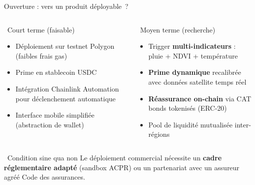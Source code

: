 \documentclass[aspectratio=169, 10pt, t]{beamer}
\begin{document}
\begin{frame}{Ouverture : vers un produit déployable~?}
  \begin{columns}[t]
      \begin{block}{\faRocket\ Court terme (faisable)}
        \begin{itemize}
          \setlength{\itemsep}{4pt}
          \item Déploiement sur testnet Polygon (faibles frais gas)
          \item Prime en stablecoin USDC
          \item Intégration Chainlink Automation pour déclenchement automatique
          \item Interface mobile simplifiée (abstraction de wallet)
        \end{itemize}
      \end{block}
      \begin{block}{\faFlask\ Moyen terme (recherche)}
        \begin{itemize}
          \setlength{\itemsep}{4pt}
          \item Trigger \textbf{multi-indicateurs} : pluie + NDVI + température
          \item \textbf{Prime dynamique} recalibrée avec données satellite temps réel
          \item \textbf{Réassurance on-chain} via CAT bonds tokenisés (ERC-20)
          \item Pool de liquidité mutualisée inter-régions
        \end{itemize}
      \end{block}
  \end{columns}
  \vspace{0.4em}
  \begin{alertblock}{\small\faGavel\ Condition sine qua non}
    \small\centering
    Le déploiement commercial nécessite un \textbf{cadre réglementaire adapté}
    (sandbox ACPR) ou un partenariat avec un assureur agréé Code des assurances.
  \end{alertblock}
\end{frame}
\end{document}
